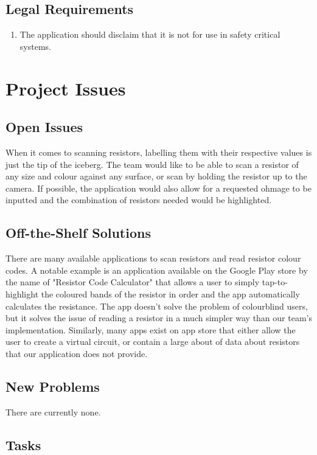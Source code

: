 \documentclass{article}
\begin{document}
\subsection{Legal Requirements}
\begin{enumerate}
\item The application should disclaim that it is not for use in safety critical systems.
\end{enumerate}

\section{Project Issues}

\subsection{Open Issues }
When it comes to scanning resistors, labelling them with their respective values is just the tip of the iceberg. The team would like to be able to scan a resistor of any size and colour against any surface, or scan by holding the resistor up to the camera. If possible, the application would also allow for a requested ohmage to be inputted and the combination of resistors needed would be highlighted.

\subsection{Off-the-Shelf Solutions}
There are many available applications to scan resistors and read resistor colour codes. A notable example is an application available on the Google Play store by the name of "Resistor Code Calculator" that allows a user to simply tap-to-highlight the coloured bands of the resistor in order and the app automatically calculates the resistance. The app doesn't solve the problem of colourblind users, but it solves the issue of reading a resistor in a much simpler way than our team's implementation. Similarly, many apps exist on app store that either allow the user to create a virtual circuit, or contain a large about of data about resistors that our application does not provide.

\subsection{New Problems}
There are currently none.

\subsection{Tasks}
\end{document}
